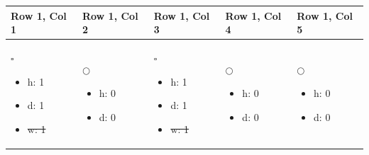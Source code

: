

\begin{table}[h]
\centering
\begin{tabular}{|p{3cm}|p{3cm}|p{3cm}|p{3cm}|p{3cm}|}
\hline
Row 1, Col 1 & Row 1, Col 2 & Row 1, Col 3 & Row 1, Col 4  & Row 1, Col 5  \\ \hline

$ \square $
\begin{itemize}
    \setlength{\itemsep}{0pt}  %
    \setlength{\parsep}{0pt}   %
    \vspace*{-1\baselineskip} 
    \item h: 1
    \item d: 1
    \item  \sout{w: 1}
\end{itemize} 

& 

$ \bigcirc $
\begin{itemize} 
    \vspace*{-1\baselineskip} 
    \item h: 0
    \item d: 0
\end{itemize} 

& 

$ \square $
\begin{itemize} 
    \vspace*{-1\baselineskip} 
    \item h: 1
    \item d: 1
    \item  \sout{w: 1}
\end{itemize} 

& 

$ \bigcirc $
\begin{itemize} 
    \vspace*{-1\baselineskip} 
    \item h: 0
    \item d: 0
\end{itemize} 

& 

$ \bigcirc $
\begin{itemize} 
    \vspace*{-1\baselineskip} 
    \item h: 0
    \item d: 0
\end{itemize} 



\end{tabular}
\end{table}
